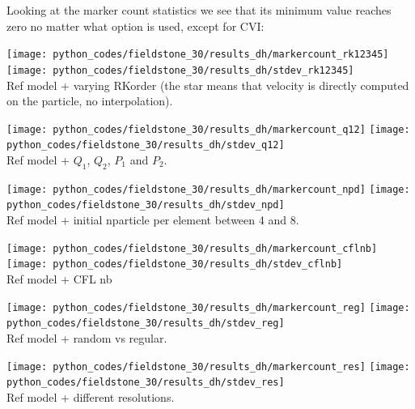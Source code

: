 Looking at the marker count statistics we see that its minimum value reaches zero no 
matter what option is used, except for CVI: 

\begin{center}
\texttt{[image: python\_codes/fieldstone\_30/results\_dh/markercount\_rk12345]}
\texttt{[image: python\_codes/fieldstone\_30/results\_dh/stdev\_rk12345]}\\
{\captionfont Ref model + varying RKorder (the star means that velocity 
is directly computed on the particle, no interpolation).}
\end{center} 

\begin{center}
\texttt{[image: python\_codes/fieldstone\_30/results\_dh/markercount\_q12]}
\texttt{[image: python\_codes/fieldstone\_30/results\_dh/stdev\_q12]}\\
{\captionfont Ref model + $Q_1$, $Q_2$, $P_1$ and $P_2$. }
\end{center}

\begin{center}
\texttt{[image: python\_codes/fieldstone\_30/results\_dh/markercount\_npd]}
\texttt{[image: python\_codes/fieldstone\_30/results\_dh/stdev\_npd]}\\
{\captionfont Ref model + initial nparticle per element between 4 and 8.}
\end{center}

\begin{center}
\texttt{[image: python\_codes/fieldstone\_30/results\_dh/markercount\_cflnb]}
\texttt{[image: python\_codes/fieldstone\_30/results\_dh/stdev\_cflnb]}\\
{\captionfont Ref model + CFL nb}
\end{center}

\begin{center}
\texttt{[image: python\_codes/fieldstone\_30/results\_dh/markercount\_reg]}
\texttt{[image: python\_codes/fieldstone\_30/results\_dh/stdev\_reg]}\\
{\captionfont Ref model + random vs regular.} 
\end{center}

\begin{center}
\texttt{[image: python\_codes/fieldstone\_30/results\_dh/markercount\_res]}
\texttt{[image: python\_codes/fieldstone\_30/results\_dh/stdev\_res]}\\
{\captionfont Ref model + different resolutions.}
\end{center}

